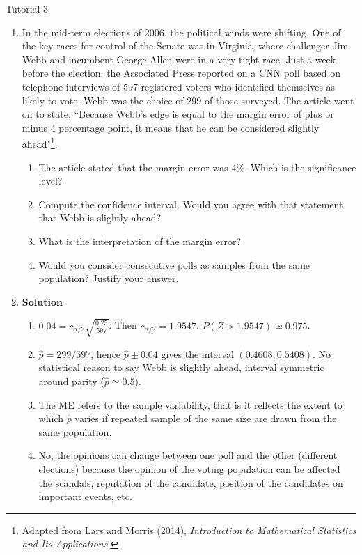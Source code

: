 \documentclass[11pt,a4paper]{article}
\newcommand{\V}[1]{``{#1}"}
\begin{document}
\begin{center}
\begin{Huge}
Tutorial 3
\end{Huge}
\end{center}


\begin{enumerate}[labelindent=0pt,labelwidth=0.75em,leftmargin=!]
\item In the mid-term elections of 2006, the political winds were shifting. One of the key races for control of the Senate was in Virginia, where challenger Jim Webb and incumbent George Allen were in a very tight race. Just a week before the election, the Associated Press reported on a CNN poll based on telephone interviews of 597 registered voters who identified themselves as likely to vote. Webb was the choice of 299 of those surveyed. The article went on to state, \V{Because Webb's edge is equal to the margin error of plus or minus 4 percentage point, it means that he can be considered slightly ahead}\footnote{Adapted from Lars and Morris (2014), \emph{Introduction to Mathematical Statistics and Its Applications}.}.
\begin{enumerate}
\item The article stated that the margin error was 4\%. Which is the significance level?
\item Compute the confidence interval. Would you agree with that statement that Webb is slightly ahead?
\item What is the interpretation of the margin error?
\item Would you consider consecutive polls as samples from the same population? Justify your answer.
\end{enumerate}
\item[]\textbf{Solution}
\begin{enumerate}
\item $0.04=c_{\alpha/2}\sqrt{\frac{0.25}{597}}$. Then $c_{\alpha/2}=1.9547$. $P(Z>1.9547)\simeq 0.975$.
\item $\hat{p}=299/597$, hence $\hat{p}\pm 0.04$ gives the interval $(0.4608, 0.5408)$. No statistical reason to say Webb is slightly ahead, interval symmetric around parity ($\hat{p}\simeq 0.5$).
\item The ME refers to the sample variability, that is it reflects the extent to which $\hat{p}$ varies if repeated sample of the same size are drawn from the same population.
\item No, the opinions can change between one poll and the other (different elections) because the opinion of the voting population can be affected the scandals, reputation of the candidate, position of the candidates on important events, etc.

\end{enumerate}
\end{enumerate}
\end{document}
